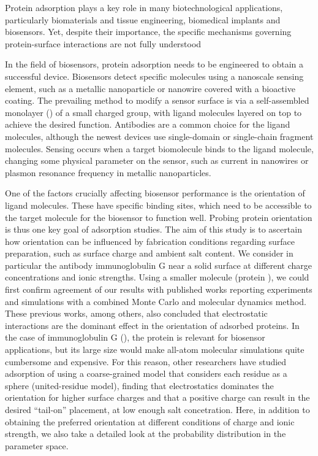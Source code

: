 
Protein adsorption plays a key role in many biotechnological applications, particularly biomaterials and tissue engineering, biomedical implants and biosensors.
Yet, despite their importance, the specific mechanisms governing protein-surface interactions are not fully understood\cite{Gray2004,RabeVerdesSeegel2011}

In the field of biosensors, protein adsorption needs to be engineered to obtain a successful device. 
Biosensors detect specific molecules using a nanoscale sensing element, such as a metallic nanoparticle or nanowire covered with a bioactive coating. 
The prevailing method to modify a sensor surface is via a self-assembled monolayer (\sam) of a small charged group, with ligand molecules layered on top to achieve the desired function. 
Antibodies are a common choice for the ligand molecules, although the newest devices use single-domain or single-chain fragment molecules.\cite{ByunETal2013,TrillingETal2014} 
Sensing occurs when a target biomolecule binds to the ligand molecule,  changing some physical parameter on the sensor, such as current in nanowires or plasmon resonance frequency in metallic nanoparticles. 

One of the factors crucially affecting biosensor performance is the orientation of ligand molecules.\cite{TajimaTakaiIshihara2011,TrillingBeekwilderZuilhof2013} 
These have specific binding sites, which need to be accessible to the target molecule for the biosensor to function well.
Probing protein orientation is thus one key goal of adsorption studies.
The aim of this study is to ascertain how orientation can be influenced by fabrication conditions regarding surface preparation, such as surface charge and ambient salt content. We consider in particular the antibody immunoglobulin G near a solid surface at different charge concentrations and ionic strengths. Using a smaller molecule (protein \gb), we could first confirm agreement of our results with published works reporting experiments\cite{BaioWeidnerBaughGambleStaytonCastner2012} and   simulations with a combined Monte Carlo and molecular dynamics method.\cite{LiuLiaoZhou2013} These previous works, among others, also concluded that electrostatic interactions are the dominant effect in the orientation of adsorbed proteins. In the case of immunoglobulin G (\ig), the protein is relevant for biosensor applications, but its large size would make all-atom molecular simulations quite cumbersome and expensive. For this reason, other researchers have studied adsorption of \ig using a coarse-grained model that considers each residue as a sphere (united-residue model),\cite{ZhouChenJiang2003} finding that electrostatics dominates the orientation for higher surface charges and that a positive charge can result in the desired ``tail-on'' placement, at low enough salt concetration. Here, in addition to obtaining the preferred orientation at different conditions of charge and ionic strength, we also take a detailed look at the probability distribution in the parameter space.

